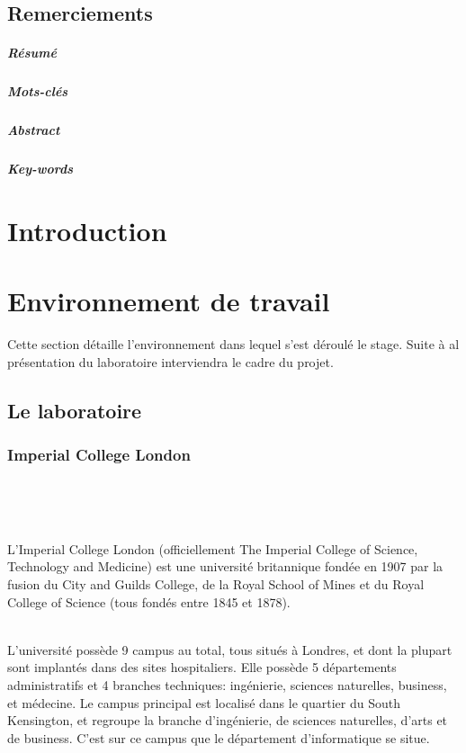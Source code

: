 \documentclass[10pt]{report}
\begin{document}
\section*{Remerciements}\newpage
\paragraph*{Résumé} %
\paragraph*{Mots-clés}
\paragraph*{Abstract}
\paragraph*{Key-words}

\renewcommand\contentsname{Sommaire}
\tableofcontents

\newpage

\chapter*{Introduction}

\chapter{Environnement de travail} 
	Cette section détaille l'environnement dans lequel s'est déroulé le stage. Suite à al présentation du laboratoire interviendra le cadre du projet.
	\section{Le laboratoire}
	
	\subsection{Imperial College London}~\par ~\par %
	L’Imperial College London (officiellement The Imperial College of Science, Technology and Medicine) est une université britannique fondée en 1907 par la fusion du City and Guilds College, de la Royal School of Mines et du Royal College of Science (tous fondés entre 1845 et 1878).\\ ~\par
    L'université possède 9 campus au total, tous situés à Londres, et dont la plupart sont implantés dans des sites hospitaliers.  
    Elle possède 5 départements administratifs et 4 branches techniques: ingénierie, sciences naturelles, business, et médecine.	Le campus principal est localisé dans le quartier du South Kensington, et regroupe la branche d'ingénierie, de sciences naturelles, d'arts et de business. C'est sur ce campus que le département d'informatique se situe. 
    
\end{document}
